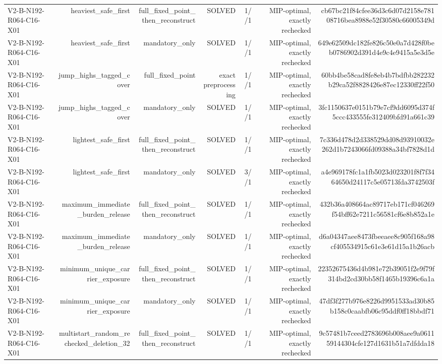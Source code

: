{\begin{longtable}{lrrrrrr}
V2-B-N192-R064-C16-X01 & heaviest\_safe\_first & full\_fixed\_point\_then\_reconstruct & SOLVED & 1//1 & MIP-optimal, exactly rechecked & cb67bc21f84cfee36d3c6d07d2158e78108716bea8988e52f30580c66005349d \\
V2-B-N192-R064-C16-X01 & heaviest\_safe\_first & mandatory\_only & SOLVED & 1//1 & MIP-optimal, exactly rechecked & 649e62509dc182fe826c50e0a7d428f0beb0786902d391d4e9c4e9415a5e3d5e \\
V2-B-N192-R064-C16-X01 & jump\_highs\_tagged\_cover & full\_fixed\_point & exact preprocessing & 1//1 & MIP-optimal, exactly rechecked & 60bb4be58cad8fe8eb4b7bdfbb282232b29ca52f8828426e87ec12330ff22f50 \\
V2-B-N192-R064-C16-X01 & jump\_highs\_tagged\_cover & mandatory\_only & SOLVED & 1//1 & MIP-optimal, exactly rechecked & 3fc1150637e0151b79e7cf9dd6095d374f5ccc433555fe312409bfd91a661c39 \\
V2-B-N192-R064-C16-X01 & lightest\_safe\_first & full\_fixed\_point\_then\_reconstruct & SOLVED & 1//1 & MIP-optimal, exactly rechecked & 7c336d478d2d338529dd08d93910032e262d1b7243066fd09388a34bf7828d1d \\
V2-B-N192-R064-C16-X01 & lightest\_safe\_first & mandatory\_only & SOLVED & 3//1 & MIP-optimal, exactly rechecked & a4e969178fc1a1fb5023d023201f8f7f3464650d24117c5e05713fda3742503f \\
V2-B-N192-R064-C16-X01 & maximum\_immediate\_burden\_release & full\_fixed\_point\_then\_reconstruct & SOLVED & 1//1 & MIP-optimal, exactly rechecked & 432b36a408664ac89717eb171cf046269f54bff62e7211c56581cf6e8b852a1e \\
V2-B-N192-R064-C16-X01 & maximum\_immediate\_burden\_release & mandatory\_only & SOLVED & 1//1 & MIP-optimal, exactly rechecked & d6a04347aee8473fbeeaee8c905f168a98cf405534915c61e3e61d15a1b26acb \\
V2-B-N192-R064-C16-X01 & minimum\_unique\_carrier\_exposure & full\_fixed\_point\_then\_reconstruct & SOLVED & 1//1 & MIP-optimal, exactly rechecked & 22352675436d4b981e72b39051f2e9f79f314bd2cd30bb58f1465b19396c6a1a \\
V2-B-N192-R064-C16-X01 & minimum\_unique\_carrier\_exposure & mandatory\_only & SOLVED & 1//1 & MIP-optimal, exactly rechecked & 47df3f277b976e8226d9951533ad30b85b158c0caabfb06c95ddf0ff18bbdf71 \\
V2-B-N192-R064-C16-X01 & multistart\_random\_rechecked\_deletion\_32 & full\_fixed\_point\_then\_reconstruct & SOLVED & 1//1 & MIP-optimal, exactly rechecked & 9c57481b7ceed2783696b008aee9a061159144304cfe127d1631b51a7dfdda18 \\

\end{longtable}}
